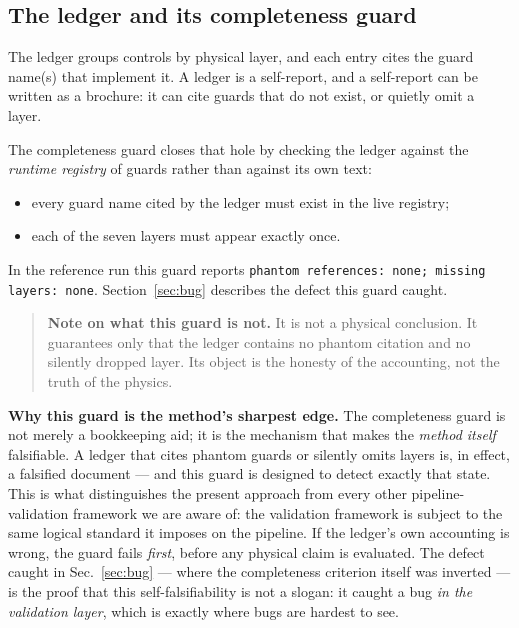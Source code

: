 \documentclass[11pt,a4paper]{article}
\newcommand{\code}[1]{\texttt{\small #1}}
\begin{document}
\subsection{The ledger and its completeness guard}
\label{sec:ledger}

The ledger groups controls by physical layer, and each entry cites the guard name(s)
that implement it. A ledger is a self-report, and a self-report can be written as a
brochure: it can cite guards that do not exist, or quietly omit a layer.

The completeness guard closes that hole by checking the ledger against the
\emph{runtime registry} of guards rather than against its own text:

\begin{itemize}[leftmargin=1.4em,itemsep=2pt]
  \item every guard name cited by the ledger must exist in the live registry;
  \item each of the seven layers must appear exactly once.
\end{itemize}

\noindent In the reference run this guard reports \code{phantom references: none;
missing layers: none}. Section~\ref{sec:bug} describes the defect this guard caught.

\begin{quote}
\textbf{Note on what this guard is not.} It is not a physical conclusion. It
guarantees only that the ledger contains no phantom citation and no silently
dropped layer. Its object is the honesty of the accounting, not the truth of the
physics.
\end{quote}

\medskip
\noindent\textbf{Why this guard is the method's sharpest edge.}
The completeness guard is not merely a bookkeeping aid; it is the mechanism that
makes the \emph{method itself} falsifiable. A ledger that cites phantom guards or
silently omits layers is, in effect, a falsified document --- and this guard is
designed to detect exactly that state. This is what distinguishes the present
approach from every other pipeline-validation framework we are aware of: the
validation framework is subject to the same logical standard it imposes on the
pipeline. If the ledger's own accounting is wrong, the guard fails
\emph{first}, before any physical claim is evaluated. The defect caught in
Sec.~\ref{sec:bug} --- where the completeness criterion itself was inverted ---
is the proof that this self-falsifiability is not a slogan: it caught a bug
\emph{in the validation layer}, which is exactly where bugs are hardest to see.
\end{document}
